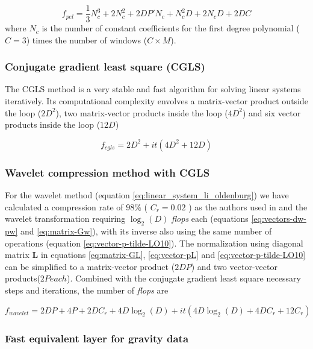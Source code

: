\begin{equation}
	f_{pel} = \dfrac{1}{3} N_c^3 + 2N_c^2 + 2DP'N_c + N_c^2D + 2N_cD + 2DC
\label{flops_pel}
\end{equation}
where $N_c$ is the number of constant coefficients for the first degree polynomial ($C = 3$) times the number of windows  ($C \times M$).

\subsubsection{Conjugate gradient least square (CGLS)}

The CGLS method is a very stable and fast algorithm for solving linear systems iteratively. Its computational complexity envolves a matrix-vector product outside the loop ($2D^2$), two matrix-vector products inside the loop ($4D^2$) and six vector products inside the loop ($12D$) \citep{aster2018parameter}

\begin{equation}
	f_{cgls} = 2D^2 + it(4D^2 + 12D)
\label{cgls}
\end{equation}

\subsubsection{Wavelet compression method with CGLS \citep{li-oldenburg2010}}

For the wavelet method (equation \ref{eq:linear_system_li_oldenburg}) we have calculated a compression rate of $98\%$ ( $C_r = 0.02$ ) as the authors used in \cite{li-oldenburg2010} and the wavelet transformation requiring $\log_2(D)$ \textit{flops} each (equations \ref{eq:vectors-dw-pw} and \ref{eq:matrix-Gw}), with its inverse also using the same number of operations (equation \ref{eq:vector-p-tilde-LO10}). The normalization using diagonal matrix $\mathbf{L}$ in equations \ref{eq:matrix-GL}, \ref{eq:vector-pL} and \ref{eq:vector-p-tilde-LO10} can be simplified to a matrix-vector product ($2DP$) and two vector-vector products($2P each$). Combined with the conjugate gradient least square necessary steps and iterations, the number of \textit{flops} are

\begin{equation}
	f_{wavelet} = 2DP + 4P + 2DC_r + 4D\log_2(D) + it(4D\log_2(D) + 4DC_r + 12C_r)
\label{wavelet}
\end{equation}

\subsubsection{Fast equivalent layer for gravity data \citep{siqueira-etal2017}}

